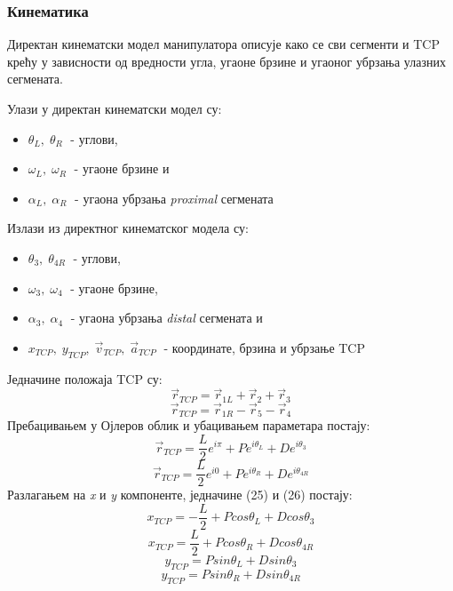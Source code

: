 \documentclass[12pt]{article}
\begin{document}
\subsubsection{Кинематика}
Директан кинематски модел манипулатора описује како се сви сегменти и TCP крећу у зависности од вредности угла, угаоне брзине и угаоног убрзања улазних сегмената.

Улази у директан кинематски модел су:
\begin{itemize}
    \item $\theta_L, \; \theta_R\;$ - углови,
    \item $\omega_L, \; \omega_R\;$ - угаоне брзине и
    \item $\alpha_L, \; \alpha_R\;$ - угаона убрзања \textit{proximal} сегмената
\end{itemize}
Излази из директног кинематског модела су:
\begin{itemize}
    \item $\theta_3, \; \theta_{4R}\;$ - углови,
    \item $\omega_3, \; \omega_4\;$ - угаоне брзине,
    \item $\alpha_3, \; \alpha_4\;$ - угаона убрзања \textit{distal} сегмената и
    \item $x_{TCP},\;y_{TCP},\; \vec{v}_{TCP},\; \vec{a}_{TCP}\;$ - координате, брзина и убрзање TCP
\end{itemize}

Једначине положаја TCP су:
\begin{equation}
    \vec{r}_{TCP} = \vec{r}_{1L} + \vec{r}_2 + \vec{r}_3
\end{equation}
\begin{equation}
    \vec{r}_{TCP} = \vec{r}_{1R} - \vec{r}_5 - \vec{r}_4
\end{equation}
Пребацивањем у Ојлеров облик и убацивањем параметара постају:
\begin{equation}
    \vec{r}_{TCP} = \dfrac{L}{2}e^{i\pi} + Pe^{i\theta_L} + De^{i\theta_3}
\end{equation}
\begin{equation}
    \vec{r}_{TCP} = \dfrac{L}{2}e^{i0} + Pe^{i\theta_R} + De^{i\theta_{4R}}
\end{equation}
Разлагањем на \textit{x} и \textit{y} компоненте, једначине (25) и (26) постају:
\begin{equation}
    x_{TCP} = -\dfrac{L}{2} + Pcos\theta_L + Dcos\theta_3
\end{equation}
\begin{equation}
    x_{TCP} = \dfrac{L}{2} + Pcos\theta_R + Dcos\theta_{4R}
\end{equation}
\begin{equation}
    y_{TCP} = Psin\theta_L + Dsin\theta_3
\end{equation}
\begin{equation}
    y_{TCP} = Psin\theta_R + Dsin\theta_{4R}
\end{equation}
\end{document}
